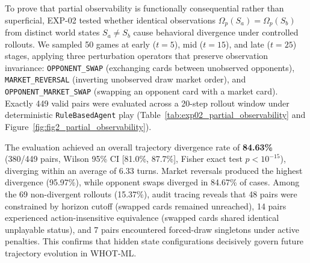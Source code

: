 \documentclass[journal]{IEEEtran}
\begin{document}
To prove that partial observability is functionally consequential rather than superficial, EXP-02 tested whether identical observations $\Omega_p(S_a) = \Omega_p(S_b)$ from distinct world states $S_a \neq S_b$ cause behavioral divergence under controlled rollouts. We sampled 50 games at early ($t=5$), mid ($t=15$), and late ($t=25$) stages, applying three perturbation operators that preserve observation invariance: \texttt{OPPONENT\_SWAP} (exchanging cards between unobserved opponents), \texttt{MARKET\_REVERSAL} (inverting unobserved draw market order), and \texttt{OPPONENT\_MARKET\_SWAP} (swapping an opponent card with a market card). Exactly 449 valid pairs were evaluated across a 20-step rollout window under deterministic \texttt{RuleBasedAgent} play (Table~\ref{tab:exp02_partial_observability} and Figure~\ref{fig:fig2_partial_observability}).

The evaluation achieved an overall trajectory divergence rate of \textbf{84.63\%} (380/449 pairs, Wilson 95\% CI [81.0\%, 87.7\%], Fisher exact test $p < 10^{-15}$), diverging within an average of 6.33 turns. Market reversals produced the highest divergence (95.97\%), while opponent swaps diverged in 84.67\% of cases. Among the 69 non-divergent rollouts (15.37\%), audit tracing reveals that 48 pairs were constrained by horizon cutoff (swapped cards remained unreached), 14 pairs experienced action-insensitive equivalence (swapped cards shared identical unplayable status), and 7 pairs encountered forced-draw singletons under active penalties. This confirms that hidden state configurations decisively govern future trajectory evolution in WHOT-ML.

\begin{table}[t]
\centering
\caption{Baseline Agent Tournament Matchups (EXP-03, $N = 5{,}000$ Episodes)}
\label{tab:exp03_baselines}
\small
{}
\end{table}
\end{document}
